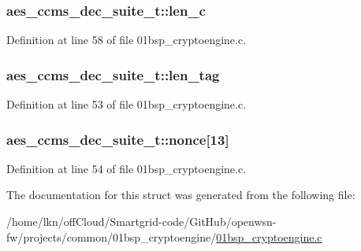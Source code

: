 \subsubsection[{\texorpdfstring{len\+\_\+c}{len_c}}]{ aes\+\_\+ccms\+\_\+dec\+\_\+suite\+\_\+t\+::len\+\_\+c}\hypertarget{structaes__ccms__dec__suite__t_ae9c9f7bce8906824dbf4477022534989}{}\label{structaes__ccms__dec__suite__t_ae9c9f7bce8906824dbf4477022534989}


Definition at line 58 of file 01bsp\+\_\+cryptoengine.\+c.

\subsubsection[{\texorpdfstring{len\+\_\+tag}{len_tag}}]{ aes\+\_\+ccms\+\_\+dec\+\_\+suite\+\_\+t\+::len\+\_\+tag}\hypertarget{structaes__ccms__dec__suite__t_ab349961aa8e6744a7b23fcd21e44f530}{}\label{structaes__ccms__dec__suite__t_ab349961aa8e6744a7b23fcd21e44f530}


Definition at line 53 of file 01bsp\+\_\+cryptoengine.\+c.

\subsubsection[{\texorpdfstring{nonce}{nonce}}]{ aes\+\_\+ccms\+\_\+dec\+\_\+suite\+\_\+t\+::nonce\mbox{[}13\mbox{]}}\hypertarget{structaes__ccms__dec__suite__t_acb5db52569c939ece78ec9c3ca37f31a}{}\label{structaes__ccms__dec__suite__t_acb5db52569c939ece78ec9c3ca37f31a}


Definition at line 54 of file 01bsp\+\_\+cryptoengine.\+c.



The documentation for this struct was generated from the following file\+:\begin{DoxyCompactItemize}
\item 
/home/lkn/off\+Cloud/\+Smartgrid-\/code/\+Git\+Hub/openwsn-\/fw/projects/common/01bsp\+\_\+cryptoengine/\hyperlink{01bsp__cryptoengine_8c}{01bsp\+\_\+cryptoengine.\+c}\end{DoxyCompactItemize}
